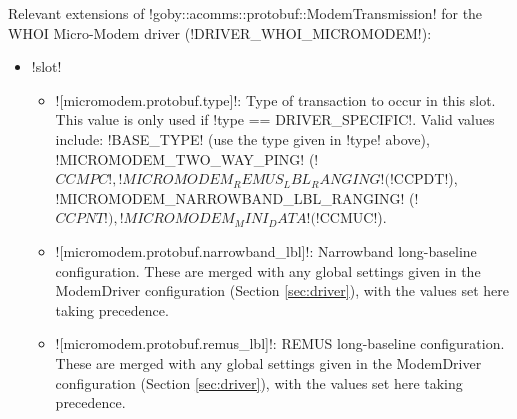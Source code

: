 Relevant extensions of !goby::acomms::protobuf::ModemTransmission! for the WHOI Micro-Modem driver (!DRIVER_WHOI_MICROMODEM!):
\begin{itemize}
\item !slot!
\begin{itemize}
\item ![micromodem.protobuf.type]!: Type of transaction to occur in this slot. This value is only used if !type == DRIVER_SPECIFIC!. Valid values include: !BASE_TYPE! (use the type given in !type! above), !MICROMODEM_TWO_WAY_PING! (!$CCMPC!, !MICROMODEM_REMUS_LBL_RANGING! (!$CCPDT!), !MICROMODEM_NARROWBAND_LBL_RANGING! (!$CCPNT!), !MICROMODEM_MINI_DATA! (!$CCMUC!).
\item ![micromodem.protobuf.narrowband_lbl]!: Narrowband long-baseline configuration. These are merged with any global settings given in the ModemDriver configuration (Section \ref{sec:driver}), with the values set here taking precedence.
\item ![micromodem.protobuf.remus_lbl]!: REMUS long-baseline configuration. These are merged with any global settings given in the ModemDriver configuration (Section \ref{sec:driver}), with the values set here taking precedence.
\end{itemize} 
\end{itemize} 

